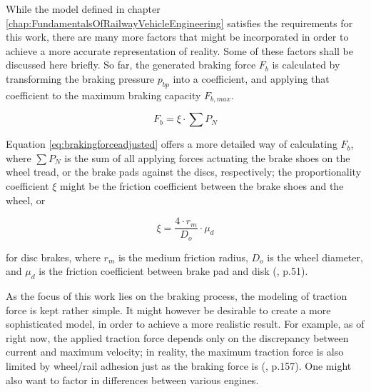 \par\noindent
While the model defined in chapter \ref{chap:FundamentalsOfRailwayVehicleEngineering} satisfies the requirements for this work, there are many more factors that might be incorporated in order to achieve a more accurate representation of reality. Some of these factors shall be discussed here briefly. So far, the generated braking force $F_{b}$ is calculated by transforming the braking pressure $p_{bp}$ into a coefficient, and applying that coefficient to the maximum braking capacity $F_{b,max}$.

\begin{equation}
\label{eq:brakingforceadjusted}
F_{b} = \xi \cdot \sum P_{N}
\end{equation}

\noindent
Equation \ref{eq:brakingforceadjusted} offers a more detailed way of calculating $F_{b}$, where $\sum P_{N}$ is the sum of all applying forces actuating the brake shoes on the wheel tread, or the brake pads against the discs, respectively; the proportionality coefficient $\xi$ might be the friction coefficient between the brake shoes and the wheel, or

\begin{equation}
\label{eq:xi}
\xi = \frac{4 \cdot r_{m}}{D_{o}} \cdot \mu_{d}
\end{equation}

\noindent
for disc brakes, where $r_{m}$ is the medium friction radius, $D_{o}$ is the wheel diameter, and $\mu_{d}$ is the friction coefficient between brake pad and disk (\cite{Cruceanu2012}, p.51).
\par
As the focus of this work lies on the braking process, the modeling of traction force is kept rather simple. It might however be desirable to create a more sophisticated model, in order to achieve a more realistic result. For example, as of right now, the applied traction force depends only on the discrepancy between current and maximum velocity; in reality, the maximum traction force is also limited by wheel/rail adhesion just as the braking force is (\cite{Wende2003}, p.157). One might also want to factor in differences between various engines.
